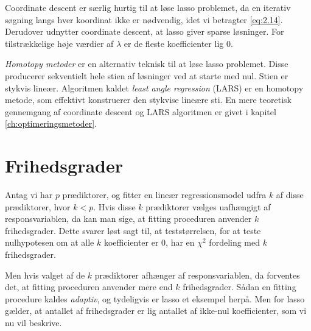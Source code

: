 
Coordinate descent er særlig hurtig til at løse lasso problemet, da en iterativ søgning langs hver koordinat ikke er nødvendig, idet vi betragter \eqref{eq:2.14}.
Derudover udnytter coordinate descent, at lasso giver sparse løsninger.
For tilstrækkelige høje værdier af \(\lambda\) er de fleste koefficienter lig $0$.

\textit{Homotopy metoder} er en alternativ teknisk til at løse lasso problemet. 
Disse producerer sekventielt hele stien af løsninger ved at starte med nul.
Stien er stykvis lineær.
Algoritmen kaldet \textit{least angle regression} (LARS) er en homotopy metode, som effektivt konstruerer den stykvise lineære sti.
En mere teoretisk gennemgang af coordinate descent og LARS algoritmen er givet i kapitel \ref{ch:optimeringsmetoder}.
%
\section{Frihedsgrader}
Antag vi har \(p\) prædiktorer, og fitter en lineær regressionsmodel udfra \(k\) af disse prædiktorer, hvor \(k <p\).
Hvis disse \(k\) prædiktorer vælges uafhængigt af responsvariablen, da kan man sige, at fitting proceduren anvender \(k\) frihedsgrader.
Dette svarer løst sagt til, at teststørrelsen, for at teste nulhypotesen om at alle \(k\) koefficienter er 0, har en \(\chi^2\) fordeling med \(k\) frihedsgrader.

Men hvis valget af de \(k\) prædiktorer afhænger af responsvariablen, da forventes det, at fitting proceduren anvender mere end \(k\) frihedsgrader. 
Sådan en fitting procedure kaldes \textit{adaptiv}, og tydeligvis er lasso et eksempel herpå.
Men for lasso gælder, at antallet af frihedsgrader er lig antallet af ikke-nul koefficienter, som vi nu vil beskrive.


